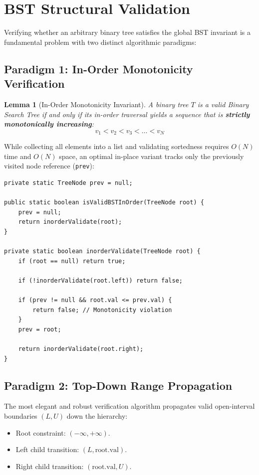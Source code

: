 \documentclass[10pt,journal,compsoc,onecolumn]{IEEEtran}
\newtheorem{lemma}[theorem]{Lemma}
\begin{document}
\section{BST Structural Validation}
\label{sec:validation}

Verifying whether an arbitrary binary tree satisfies the global BST invariant is a fundamental problem with two distinct algorithmic paradigms:

\subsection{Paradigm 1: In-Order Monotonicity Verification}

\begin{lemma}[In-Order Monotonicity Invariant]
A binary tree $T$ is a valid Binary Search Tree if and only if its in-order traversal yields a sequence that is \textbf{strictly monotonically increasing}:
\begin{equation}
    v_1 < v_2 < v_3 < \dots < v_N
\end{equation}
\end{lemma}

While collecting all elements into a list and validating sortedness requires $O(N)$ time and $O(N)$ space, an optimal in-place variant tracks only the previously visited node reference (\texttt{prev}):

\begin{verbatim}
private static TreeNode prev = null;

public static boolean isValidBSTInOrder(TreeNode root) {
    prev = null;
    return inorderValidate(root);
}

private static boolean inorderValidate(TreeNode root) {
    if (root == null) return true;

    if (!inorderValidate(root.left)) return false;

    if (prev != null && root.val <= prev.val) {
        return false; // Monotonicity violation
    }
    prev = root;

    return inorderValidate(root.right);
}
\end{verbatim}

\subsection{Paradigm 2: Top-Down Range Propagation}

The most elegant and robust verification algorithm propagates valid open-interval boundaries $(L, U)$ down the hierarchy:
\begin{itemize}
    \item Root constraint: $(-\infty, +\infty)$.
    \item Left child transition: $(L, \mathrm{root.val})$.
    \item Right child transition: $(\mathrm{root.val}, U)$.
\end{itemize}
\end{document}
